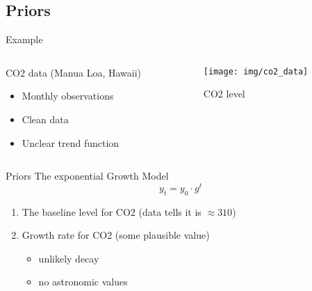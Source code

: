 \documentclass{beamer}
\begin{document}
\subsection{Priors}
\begin{frame}{Example}
    \begin{columns}
        \begin{column}{0.5\linewidth}
        CO2 data (Manua Loa, Hawaii)
        \begin{itemize}
            \item Monthly observations
            \item Clean data
            \item Unclear trend function
        \end{itemize}
        \end{column}
        \begin{column}{0.5\linewidth}
        \begin{figure}
            \centering
            \texttt{[image: img/co2\_data]}
            \caption{CO2 level}
        \end{figure}
        \end{column}
    \end{columns}
\end{frame}
\begin{frame}{Priors}
The exponential Growth Model
\begin{equation*}
    y_t = y_0 \cdot g^t
\end{equation*}
\begin{enumerate}
    \item The baseline level for CO2 (data tells it is  $\approx310$)
    \item Growth rate for CO2 (some plausible value)
    \begin{itemize}
        \item unlikely decay
        \item no astronomic values
    \end{itemize}
\end{enumerate}
\end{frame}
\end{document}

